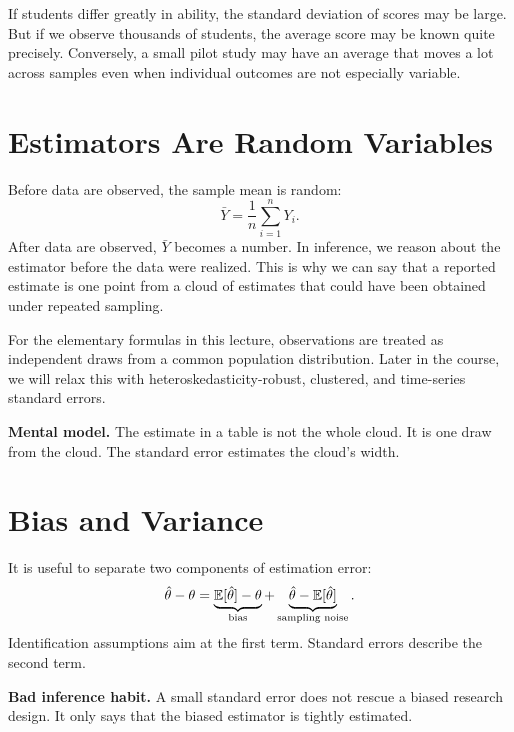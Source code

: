If students differ greatly in ability, the standard deviation of scores may be
large. But if we observe thousands of students, the average score may be known
quite precisely. Conversely, a small pilot study may have an average that moves
a lot across samples even when individual outcomes are not especially
variable.

\section{Estimators Are Random Variables}

Before data are observed, the sample mean is random:
\[
  \bar{Y} = \frac{1}{n}\sum_{i=1}^n Y_i.
\]
After data are observed, $\bar{Y}$ becomes a number. In inference, we reason
about the estimator before the data were realized. This is why we can say that
a reported estimate is one point from a cloud of estimates that could have
been obtained under repeated sampling.

\begin{assN}
For the elementary formulas in this lecture, observations are treated as
independent draws from a common population distribution. Later in the course,
we will relax this with heteroskedasticity-robust, clustered, and time-series
standard errors.
\end{assN}

\begin{boxD}
\textbf{Mental model.} The estimate in a table is not the whole cloud. It is
one draw from the cloud. The standard error estimates the cloud's width.
\end{boxD}

\section{Bias and Variance}

It is useful to separate two components of estimation error:
\[
  \hat{\theta}-\theta
  =
  \underbrace{\mathbb{E}[\hat{\theta}]-\theta}_{\text{bias}}
  +
  \underbrace{\hat{\theta}-\mathbb{E}[\hat{\theta}]}_{\text{sampling noise}}.
\]
Identification assumptions aim at the first term. Standard errors describe
the second term.

\begin{boxF}
\textbf{Bad inference habit.} A small standard error does not rescue a biased
research design. It only says that the biased estimator is tightly estimated.
\end{boxF}

